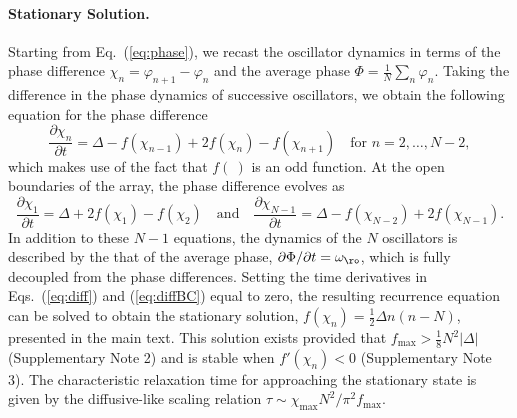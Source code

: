 

\paragraph{Stationary Solution.} 
Starting from Eq.~(\ref{eq:phase}), we recast the oscillator dynamics in terms of the phase difference $\chi_n=\varphi_{n+1} - \varphi_n$ and the average phase $\Phi=\tfrac{1}{N}\sum_n\varphi_n$.  Taking the difference in the phase dynamics of successive oscillators, we obtain the following equation for the phase difference 
\begin{equation}
    \frac{\partial \chi_n}{\partial t} = \Delta - f(\chi_{n-1}) + 2 f(\chi_n) - f(\chi_{n+1})\quad\text{for }n=2,\dots,N-2, \label{eq:diff}
\end{equation}
which makes use of the fact that $f(~)$ is an odd function.  At the open boundaries of the array, the phase difference evolves as
\begin{equation}
    \frac{\partial \chi_1}{\partial t} = \Delta + 2f(\chi_1) - f(\chi_2)\quad\text{and}\quad\frac{\partial \chi_{N-1}}{\partial t} = \Delta - f(\chi_{N-2}) + 2f(\chi_{N-1}). \label{eq:diffBC}
\end{equation}
In addition to these $N-1$ equations, the dynamics of the $N$ oscillators is described by the that of the average phase, $\partial \Phi /\partial t = \omega_{\ro}$, which is fully decoupled from the phase differences. Setting the time derivatives in Eqs.~(\ref{eq:diff}) and (\ref{eq:diffBC}) equal to zero, the resulting recurrence equation can be solved to obtain the stationary solution, $f(\chi_n) = \tfrac{1}{2}\Delta n(n-N)$, presented in the main text. This solution exists provided that $f_{\max}>\tfrac{1}{8}N^2\lvert\Delta\rvert$ (Supplementary Note 2) and is stable when $f'(\chi_n)<0$ (Supplementary Note 3). The characteristic relaxation time for approaching the stationary state is given by the diffusive-like scaling relation $\tau\sim \chi_{\max}N^2/\pi^2 f_{\max}$.


